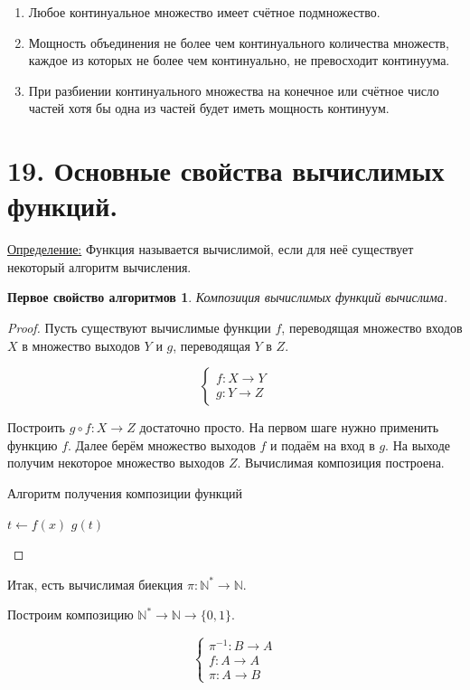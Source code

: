 \documentclass[a4paper, 12pt]{article}
\newtheorem*{algo1}{Первое свойство алгоритмов}
\newcommand{\definition}{\underline{Определение:} }
\newcommand{\N}{\mathbb{N}}
\begin{document}
\begin{enumerate}
    \item Любое континуальное множество имеет счётное подмножество.
    \item Мощность объединения не более чем континуального количества множеств, каждое из которых не более чем континуально, не превосходит континуума.
    \item При разбиении континуального множества на конечное или счётное число частей хотя бы одна из частей будет иметь мощность континуум.
\end{enumerate}

\section*{19.  Основные свойства вычислимых функций.}

\definition{Функция называется вычислимой, если для неё существует некоторый алгоритм вычисления.}

\begin{algo1}
Композиция вычислимых функций вычислима.
\end{algo1}
\begin{proof}
Пусть существуют вычислимые функции $f$, переводящая множество входов $X$ в множество выходов $Y$ и $g$, переводящая $Y$ в $Z$.

\[
    \begin{cases}
        f: X \to Y \\
        g: Y \to Z
    \end{cases}
\]

Построить $g \circ f: X \to Z$ достаточно просто. На первом шаге нужно применить функцию $f$. Далее берём множество выходов $f$ и подаём на вход в $g$. На выходе получим некоторое множество выходов $Z$. Вычислимая композиция построена.

\begin{algorithm}
\caption{Алгоритм получения композиции функций}
\begin{algorithmic}[1]
    \State $t \gets f(x)$
    \State \Return $g(t)$
\EndFunction
\end{algorithmic}
\end{algorithm}
\end{proof}

Итак, есть вычислимая биекция $\pi: \N^* \to \N$.

Построим композицию $\N^* \to \N \to \{0, 1\}$.

\[
    \begin{cases}
        \pi^{-1}: B \to A \\
        f: A \to A \\
        \pi: A \to B
    \end{cases}
\]
\end{document}
